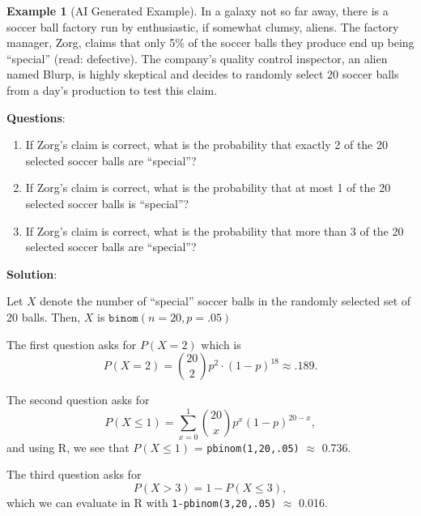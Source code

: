 \documentclass[
]{book}
\providecommand{\tightlist}{%
  \setlength{\itemsep}{0pt}\setlength{\parskip}{0pt}}
\theoremstyle{definition}
\theoremstyle{definition}
\newtheorem{example}{Example}[chapter]
\theoremstyle{definition}
\theoremstyle{definition}
\theoremstyle{remark}
\begin{document}
\begin{example}[AI Generated Example]
\protect\hypertarget{exm:binomial-AI-generated}{}\label{exm:binomial-AI-generated}In a galaxy not so far away, there is a soccer ball factory run by enthusiastic, if somewhat clumsy, aliens. The factory manager, Zorg, claims that only 5\% of the soccer balls they produce end up being ``special'' (read: defective). The company's quality control inspector, an alien named Blurp, is highly skeptical and decides to randomly select 20 soccer balls from a day's production to test this claim.

\textbf{Questions}:

\begin{enumerate}
\def\labelenumi{\arabic{enumi}.}
\tightlist
\item
  If Zorg's claim is correct, what is the probability that exactly 2 of the 20 selected soccer balls are ``special''?
\item
  If Zorg's claim is correct, what is the probability that at most 1 of the 20 selected soccer balls is ``special''?
\item
  If Zorg's claim is correct, what is the probability that more than 3 of the 20 selected soccer balls are ``special''?
\end{enumerate}

\textbf{Solution}:

Let \(X\) denote the number of ``special'' soccer balls in the randomly selected set of 20 balls. Then, \(X\) is \(\texttt{binom}(n=20,p=.05)\)

The first question asks for \(P(X = 2)\) which is \[P(X = 2) = \binom{20}{2} p^2 \cdot (1-p)^{18} \approx .189.\]

The second question asks for \[P(X \leq 1) = \sum_{x = 0}^1 \binom{20}{x}p^x(1-p)^{20-x},\]
and using R, we see that \(P(X \leq 1)\) = \texttt{pbinom(1,20,.05)} \(\approx\) 0.736.

The third question asks for \[P(X > 3) = 1 - P(X \leq 3),\]
which we can evaluate in R with
\texttt{1-pbinom(3,20,.05)} \(\approx\) 0.016.
\end{example}
\end{document}
